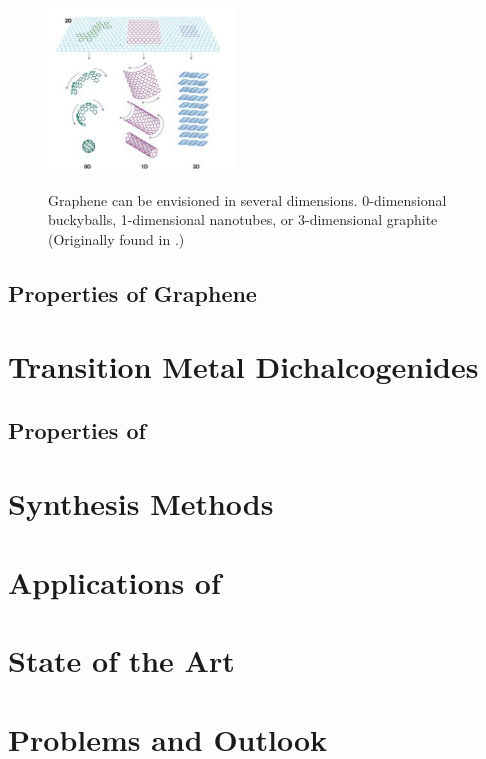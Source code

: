 \documentclass[%
 reprint,
 amsmath,amssymb,
 aps,
pra,
]{revtex4-1}
\begin{document}
\begin{figure}
\includegraphics[height=5cm, width=5cm]{../figs/multiDimGraphene}
\caption{Graphene can be envisioned in several dimensions. 0-dimensional buckyballs, 1-dimensional nanotubes, or 3-dimensional graphite (Originally found in \cite{Novoselov2007}.)}
\label{fig:sp2}
\end{figure}

\subsection{\label{subsec:properties_graphene} Properties of Graphene}

\section{\label{sec:TMDs} Transition Metal Dichalcogenides}

\subsection{\label{subsec:mos2_properties} Properties of }

\section{\label{sec:synthesis_methods} Synthesis Methods}

\section{\label{sec:mos2_applications} Applications of }

\section{\label{sec:state_of_the_art} State of the Art}

\section{\label{sec:problems_and_outlook} Problems and Outlook}




\end{document}
